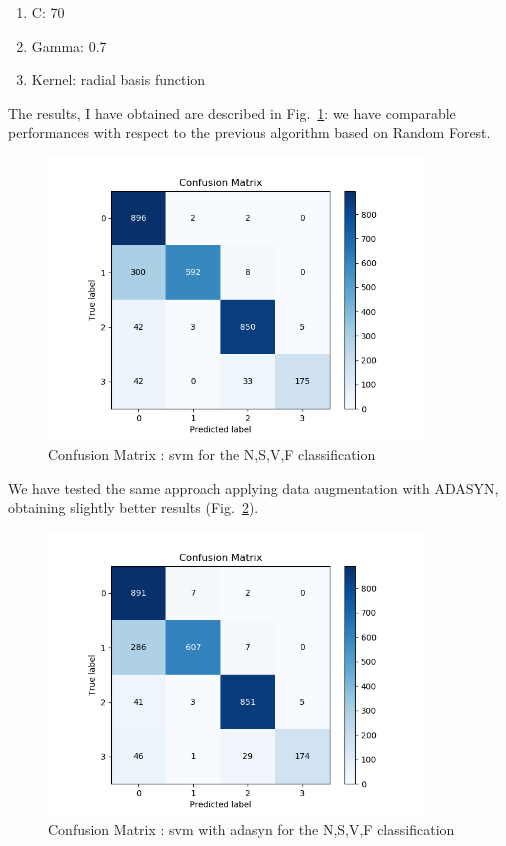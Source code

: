 \documentclass[LaM,binding=0.6cm]{sapthesis}
\begin{document}
\begin{enumerate}
\item C: 70
\item Gamma: 0.7
\item Kernel: radial basis function
\end{enumerate}
The results, I have obtained are described in Fig.~\ref{fig:svc2}: we have comparable performances with respect to the previous algorithm based on Random Forest.
\begin{figure}[H]  \centering
	\includegraphics[width=100mm,scale=0.7]{confusion-matrix-linear-not-linear-no-aug-smaller-test.png}
	\caption{Confusion Matrix : svm for the N,S,V,F classification}
	\label{fig:svc2}
\end{figure}
We have tested the same approach applying data augmentation with ADASYN, obtaining slightly better results (Fig.~\ref{fig:svc3}).
\begin{figure}[H]  \centering
	\includegraphics[width=100mm,scale=0.7]{confusion-matrix-linear-not-linear-adasyn-smaller-test.png}
	\caption{Confusion Matrix : svm with adasyn for the N,S,V,F classification}
	\label{fig:svc3}
\end{figure}
\end{document}
